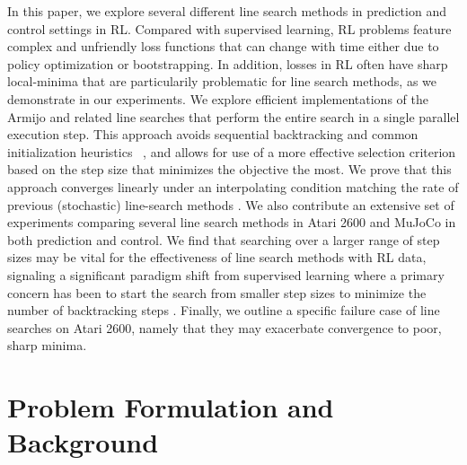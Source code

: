 \documentclass[10pt]{article} %
\begin{document}
In this paper, we explore several different line search methods in prediction and control settings in RL. Compared with supervised learning, RL problems feature complex and unfriendly loss functions that can change with time either due to policy optimization or bootstrapping. In addition, losses in RL often have sharp local-minima that are particularily problematic for line search methods, as we demonstrate in our experiments. We explore efficient implementations of the Armijo and related line searches that perform the entire search in a single parallel execution step. This approach avoids sequential backtracking and common initialization heuristics ~\citep{vaswani2019painless,galli2023monotone}, and allows for use of a more effective selection criterion based on the step size that minimizes the objective the most. 
We prove that this approach converges linearly under an interpolating condition matching the rate of previous (stochastic) line-search methods \citep{vaswani2019painless,galli2023monotone}. 
We also contribute an extensive set of experiments comparing several line search methods in Atari 2600 and MuJoCo in both prediction and control. We find that searching over a larger range of step sizes may be vital for the effectiveness of line search methods with RL data, signaling a significant paradigm shift from supervised learning where a primary concern has been to start the search from smaller step sizes to minimize the number of backtracking steps \citep{vaswani2019painless,galli2023monotone}. Finally, we outline a specific failure case of line searches on Atari 2600, namely that they may exacerbate convergence to poor, sharp minima.
 
\section{Problem Formulation and Background}
\end{document}
